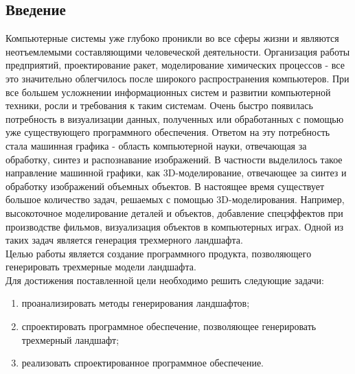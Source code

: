 \documentclass{article}
\begin{document}
	
	\newpage
	\tableofcontents
	\newpage
	\begin{center}
	    \section*{Введение}
	\end{center}
	\indent \indent Компьютерные системы уже глубоко проникли во все сферы жизни и являются неотъемлемыми составляющими человеческой деятельности. Организация работы предприятий, проектирование ракет, моделирование химических процессов - все это значительно облегчилось после широкого распространения компьютеров.
		\newline
	\indent При все большем усложнении информационных систем и развитии компьютерной техники, росли и требования к таким системам. Очень быстро появилась потребность в визуализации данных, полученных или обработанных с помощью уже существующего программного обеспечения. Ответом на эту потребность стала машинная графика - область компьютерной науки, отвечающая за обработку, синтез и распознавание изображений. В частности выделилось такое направление машинной графики, как 3D-моделирование, отвечающее за синтез и обработку изображений объемных объектов.
\newline
	\indent В настоящее время существует большое количество задач, решаемых с помощью 3D-моделирования. Например, высокоточное моделирование деталей и объектов, добавление спецэффектов при производстве фильмов, визуализация объектов в компьютерных играх. Одной из таких задач является генерация трехмерного ландшафта.
	\\ \indent
	Целью работы является создание программного продукта, позволяющего генерировать трехмерные модели ландшафта.
\\ \indent Для достижения поставленной цели необходимо решить следующие задачи:
	\begin{enumerate}
		\item проанализировать методы генерирования ландшафтов;
		\item спроектировать программное обеспечение, позволяющее генерировать трехмерный ландшафт;
		\item реализовать спроектированное программное обеспечение.
	\end{enumerate}

	\newpage
\end{document}
